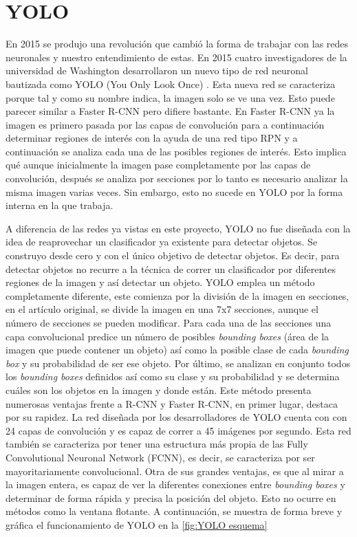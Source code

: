 \newpage
\section{YOLO}
En 2015 se produjo una revolución que cambió la forma de trabajar con las redes neuronales y nuestro entendimiento de estas. En 2015 cuatro investigadores de la universidad de Washington desarrollaron un nuevo tipo de red neuronal bautizada como YOLO (You Only Look Once) \citep{YOLO}. Esta nueva red se caracteriza porque tal y como su nombre indica, la imagen solo se ve una vez. Esto puede parecer similar a Faster R-CNN pero difiere bastante. En Faster R-CNN ya la imagen es primero pasada por las capas de convolución para a continuación determinar regiones de interés con la ayuda de una red tipo RPN y a continuación se analiza cada una de las posibles regiones de interés. Esto implica qué aunque inicialmente la imagen pase completamente por las capas de convolución, después se analiza por secciones por lo tanto es necesario analizar la misma imagen varias veces. Sin embargo, esto no sucede en YOLO por la forma interna en la que trabaja.

A diferencia de las redes ya vistas en este proyecto, YOLO no fue diseñada con la idea de reaprovechar un clasificador ya existente para detectar objetos. Se construyo desde cero y con el único objetivo de detectar objetos. Es decir, para detectar objetos no recurre a la técnica de correr un clasificador por diferentes regiones de la imagen y así detectar un objeto. YOLO emplea un método completamente diferente, este comienza por la división de la imagen en secciones, en el artículo original, se divide la imagen en una 7x7 secciones, aunque el número de secciones se pueden modificar. Para cada una de las secciones una capa convolucional predice un número de posibles \textit{bounding boxes} (área de la imagen que puede contener un objeto) así como la posible clase de cada \textit{bounding box} y su probabilidad de ser ese objeto. Por último, se analizan en conjunto todos los \textit{bounding boxes} definidos así como su clase y su probabilidad y se determina cuáles son los objetos en la imagen y donde están. Este método presenta numerosas ventajas frente a R-CNN y Faster R-CNN, en primer lugar, destaca por su rapidez. La red diseñada por los desarrolladores de YOLO cuenta con con 24 capas de convolución y es capaz de correr a 45 imágenes por segundo. Esta red también se caracteriza por tener una estructura más propia de las Fully Convolutional Neuronal Network (FCNN), es decir, se caracteriza por ser mayoritariamente convolucional. Otra de sus grandes ventajas, es que al mirar a la imagen entera, es capaz de ver la diferentes conexiones entre \textit{bounding boxes} y determinar de forma rápida y precisa la posición del objeto. Esto no ocurre en métodos como la ventana flotante. A continuación, se muestra de forma breve y gráfica el funcionamiento de YOLO en la \autoref{fig:YOLO esquema}

